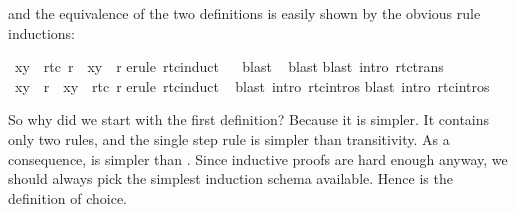 \begin{isabellebody}
%
\begin{isamarkuptext}%
\noindent
and the equivalence of the two definitions is easily shown by the obvious rule
inductions:%
\end{isamarkuptext}%
\isamarkupfalse%
\ {\isachardoublequote}{\isacharparenleft}x{\isacharcomma}y{\isacharparenright}\ {\isasymin}\ rtc{}\ r\ {\isasymLongrightarrow}\ {\isacharparenleft}x{\isacharcomma}y{\isacharparenright}\ {\isasymin}\ r{\isacharasterisk}{\isachardoublequote}\isanewline
%
\isadelimproof
%
\endisadelimproof
%
\isatagproof
\isamarkupfalse%
erule\ rtc{}{\isachardot}induct{\isacharparenright}\isanewline
\ \ \isamarkupfalse%
blast{\isacharparenright}\isanewline
\ \isamarkupfalse%
blast{\isacharparenright}\isanewline
\isamarkupfalse%
blast\ intro{\isacharcolon}\ rtc{\isacharunderscore}trans{\isacharparenright}\isanewline
\isamarkupfalse%
%
\endisatagproof
{\isafoldproof}%
%
\isadelimproof
\isanewline
%
\endisadelimproof
\isanewline
\isamarkupfalse%
\ {\isachardoublequote}{\isacharparenleft}x{\isacharcomma}y{\isacharparenright}\ {\isasymin}\ r{\isacharasterisk}\ {\isasymLongrightarrow}\ {\isacharparenleft}x{\isacharcomma}y{\isacharparenright}\ {\isasymin}\ rtc{}\ r{\isachardoublequote}\isanewline
%
\isadelimproof
%
\endisadelimproof
%
\isatagproof
\isamarkupfalse%
erule\ rtc{\isachardot}induct{\isacharparenright}\isanewline
\ \isamarkupfalse%
blast\ intro{\isacharcolon}\ rtc{}{\isachardot}intros{\isacharparenright}\isanewline
\isamarkupfalse%
blast\ intro{\isacharcolon}\ rtc{}{\isachardot}intros{\isacharparenright}\isanewline
\isamarkupfalse%
%
\endisatagproof
{\isafoldproof}%
%
\isadelimproof
%
\endisadelimproof
\isamarkuptrue%
%
\begin{isamarkuptext}%
So why did we start with the first definition? Because it is simpler. It
contains only two rules, and the single step rule is simpler than
transitivity.  As a consequence,  is simpler than
. Since inductive proofs are hard enough
anyway, we should always pick the simplest induction schema available.
Hence  is the definition of choice.


\end{isamarkuptext}
\end{isabellebody}
